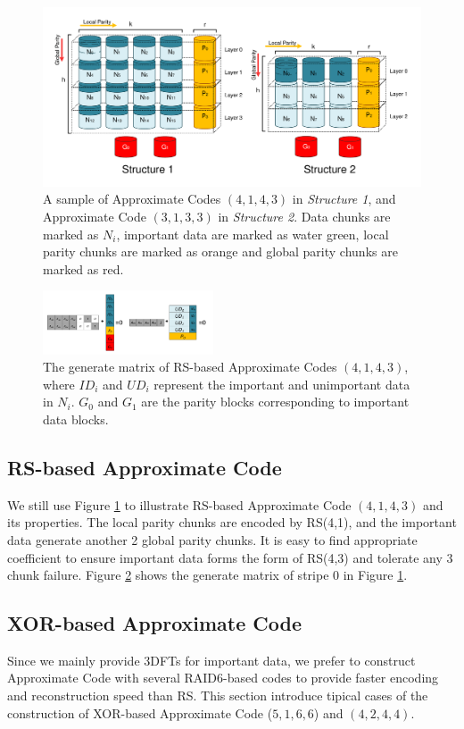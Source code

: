 \documentclass[sigconf]{acmart}
\begin{document}
\begin{figure}[h]
\centering
\includegraphics[width=\linewidth]{photo/AP-kmha-v7.pdf}
\caption{A sample of Approximate Codes $(4,1,4,3)$ in \emph{Structure 1}, and Approximate Code $(3,1,3,3)$ in \emph{Structure 2}.
Data chunks are marked as $N_i$, important data are marked as water green, local parity chunks are marked as orange and global parity chunks are marked as red.
}
\label{fig-ap-4143}
\end{figure}

\begin{figure}[htb]
\centering
\includegraphics[width=0.45\textwidth]{photo/AP-RS-43.pdf}
\caption{The generate matrix of RS-based Approximate Codes $(4,1,4,3)$, where $ID_i$ and $UD_i$ represent the important and unimportant data in $N_i$. $G_0$ and $G_1$ are the parity blocks corresponding to important data blocks.}
\label{fig-ap-rs}
\end{figure}

\subsection{RS-based Approximate Code}
We still use Figure \ref{fig-ap-4143} to illustrate RS-based Approximate Code $(4,1,4,3)$ and its properties. The local parity chunks are encoded by RS(4,1), and the important data generate another 2 global parity chunks. It is easy to find appropriate coefficient to ensure important data forms the form of RS(4,3) and tolerate any 3 chunk failure. Figure \ref{fig-ap-rs} shows the generate matrix of stripe 0 in Figure \ref{fig-ap-4143}.

\subsection{XOR-based Approximate Code}
Since we mainly provide 3DFTs for important data, we prefer to construct Approximate Code with several RAID6-based codes to provide faster encoding and reconstruction speed than RS. This section introduce tipical cases of the construction of XOR-based Approximate Code ($5,1,6,6$) and $(4,2,4,4)$.
\end{document}
